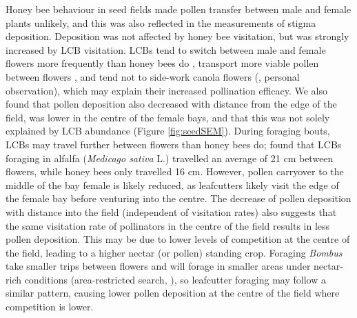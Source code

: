 \documentclass[12pt]{article} %
\begin{document}
Honey bee behaviour in seed fields made pollen transfer between male and female plants unlikely, and this was also reflected in the measurements of stigma deposition. 
Deposition was not affected by honey bee visitation, but was strongly increased by LCB visitation.
LCBs tend to switch between male and female flowers more frequently than honey bees do \citep{waytesMsc}, transport more viable pollen between flowers \citep{parker2015}, and tend not to side-work canola flowers (\citealp{soroka2001}, personal observation), which may explain their increased pollination efficacy.
We also found that pollen deposition also decreased with distance from the edge of the field, was lower in the centre of the female bays, and that this was not solely explained by LCB abundance (Figure \ref{fig:seedSEM}).
During foraging bouts, LCBs may travel further between flowers than honey bees do; \citet{brunet2019} found that LCBs foraging in alfalfa (\emph{Medicago sativa} L.) travelled an average of 21 cm between flowers, while honey bees only travelled 16 cm.
However, pollen carryover \citep{thomson1986} to the middle of the bay female is likely reduced, as leafcutters likely visit the edge of the female bay before venturing into the centre.
The decrease of pollen deposition with distance into the field (independent of visitation rates) also suggests that the same visitation rate of pollinators in the centre of the field results in less pollen deposition.
This may be due to lower levels of competition at the centre of the field, leading to a higher nectar (or pollen) standing crop. %
Foraging \textit{Bombus} take smaller trips between flowers and will forage in smaller areas under nectar-rich conditions (area-restricted search, \citealp{pyke1978b, heinrich1979}), so leafcutter foraging may follow a similar pattern, causing lower pollen deposition at the centre of the field where competition is lower.
\end{document}
